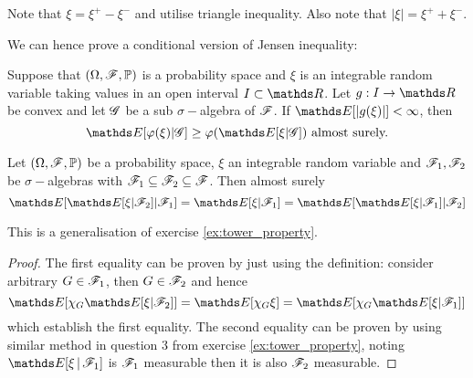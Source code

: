 \begin{hint}
Note that $\xi = \xi^+ - \xi^-$ and utilise triangle inequality. Also note that $|\xi| = \xi^+ + \xi^-$.
\end{hint}

We can hence prove a conditional version of Jensen inequality:
\begin{theorem}
Suppose that $(\Omega, \mathcal{F},\mathbb{P})$ is a probability space and $\xi$ is an integrable random variable taking values in an open interval $I \subset \R$. Let $g: I \to \R$ be convex and let $\mathcal{G}$ be a sub $\sigma-$algebra of $\mathcal{F}$. If $\E[|g(\xi)|] < \infty$, then
\begin{equation} \label{eq:conditional_Jensen_ineq}
    \E[\varphi(\xi) | \G] \ge \varphi(\E[\xi | \G])  \text{ almost surely.}
\end{equation}
\end{theorem}

\begin{property} \label{prop:tower_property_general}
Let $(\Omega, \mathcal{F},\mathbb{P})$ be a probability space, $\xi$ an integrable random variable and $\mathcal{F}_1, \mathcal{F}_2$ be $\sigma-$algebras with $\mathcal{F}_1 \subseteq \mathcal{F}_2 \subseteq \mathcal{F}$. Then almost surely
\begin{equation}
\E[\E[\xi | \F_2] | \F_1] = \E[\xi | \F_1] = \E[\E[\xi | \F_1] | \F_2]
\end{equation}
\end{property}

\begin{hint}
This is a generalisation of exercise \ref{ex:tower_property}.
\end{hint}

\begin{proof}
The first equality can be proven by just using the definition: consider arbitrary $G \in \mathcal{F}_1$, then $G \in \mathcal{F}_2$ and hence 
\begin{equation}
    \E[\chi_G \E[\xi | \F_2]] = \E[\chi_G \xi] = \E[\chi_G \E[\xi | \F_1]]
\end{equation}
which establish the first equality. The second equality can be proven by using similar method in  question 3 from exercise \ref{ex:tower_property}, noting $\E[\xi\,|\,\F_1]$ is $\mathcal{F}_1$ measurable then it is also $\mathcal{F}_2$ measurable.
\end{proof}

